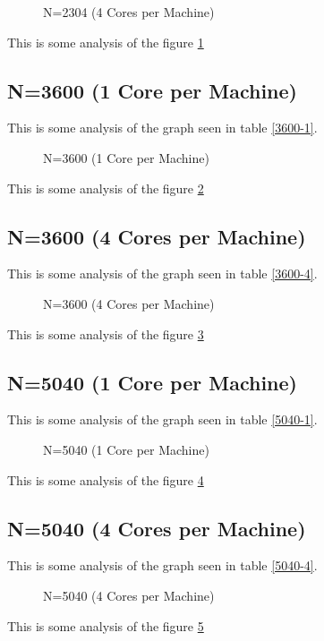 \documentclass[a4paper]{article}
\begin{document}
\begin{figure}
    
    \caption{N=2304 (4 Cores per Machine)}
    \label{fig:2304_4}
\end{figure}

This is some analysis of the figure \ref{fig:2304_4}

\subsection{N=3600 (1 Core per Machine)}

This is some analysis of the graph seen in table \ref{3600-1}.

\begin{figure}
    
    \caption{N=3600 (1 Core per Machine)}
    \label{fig:3600_1}
\end{figure}

This is some analysis of the figure \ref{fig:3600_1}

\subsection{N=3600 (4 Cores per Machine)}

This is some analysis of the graph seen in table \ref{3600-4}.

\begin{figure}
    
    \caption{N=3600 (4 Cores per Machine)}
    \label{fig:3600_4}
\end{figure}

This is some analysis of the figure \ref{fig:3600_4}

\subsection{N=5040 (1 Core per Machine)}

This is some analysis of the graph seen in table \ref{5040-1}.

\begin{figure}
    
    \caption{N=5040 (1 Core per Machine)}
    \label{fig:5040_1}
\end{figure}

This is some analysis of the figure \ref{fig:5040_1}

\subsection{N=5040 (4 Cores per Machine)}

This is some analysis of the graph seen in table \ref{5040-4}.

\begin{figure}
    
    \caption{N=5040 (4 Cores per Machine)}
    \label{fig:5040_4}
\end{figure}

This is some analysis of the figure \ref{fig:5040_4}
\end{document}
